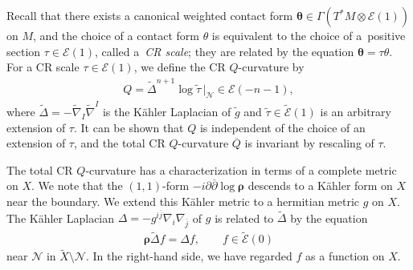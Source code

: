 \documentclass[pdftex]{sigma}
\numberwithin{equation}{section}
\begin{document}
Recall that there exists a canonical weighted contact form $\boldsymbol{\theta}\in \Gamma(T^\ast M\otimes\mathcal{E}(1))$ on $M$, and the choice of a contact form $\theta$ is equivalent to the choice of a~positive section $\tau\in\mathcal{E}(1)$, called a~{\it CR scale};
they are related by the equation $\boldsymbol{\theta}=\tau \theta$. For a CR scale $\tau\in\mathcal{E}(1)$, we def\/ine the CR $Q$-curvature by
\begin{gather*}
Q=\widetilde{\Delta}^{n+1}\log\widetilde\tau\, |_{\mathcal{N}}\in\mathcal{E}(-n-1),
\end{gather*}
where $\widetilde\Delta=-\widetilde\nabla_I\widetilde\nabla^I$ is the K\"ahler Laplacian of $\widetilde g$ and $\widetilde\tau\in\widetilde{\mathcal{E}}(1)$ is an arbitrary extension of $\tau$. It can be shown that $Q$ is independent of the choice of an extension of $\tau$, and the total CR $Q$-curvature
$\overline{Q}$ is invariant by rescaling of $\tau$.

The total CR $Q$-curvature has a characterization in terms of a complete metric on $X$. We note that the $(1, 1)$-form $-i\partial\overline{\partial}\log \boldsymbol\rho$ descends to a K\"ahler form on $X$ near the boundary. We extend this K\"ahler metric to a hermitian metric $g$ on $X$. The K\"ahler Laplacian $\Delta=-g^{i\overline j}\nabla_i\nabla_{\overline j}$ of $g$ is related to $\widetilde\Delta$ by the equation
\begin{gather}\label{laplacians}
\boldsymbol\rho\widetilde\Delta f=\Delta f, \qquad f\in\widetilde{\mathcal{E}}(0)
\end{gather}
near $\mathcal{N}$ in $\widetilde X\setminus\mathcal{N}$. In the right-hand side, we have regarded $f$ as a function on $X$.
\end{document}
